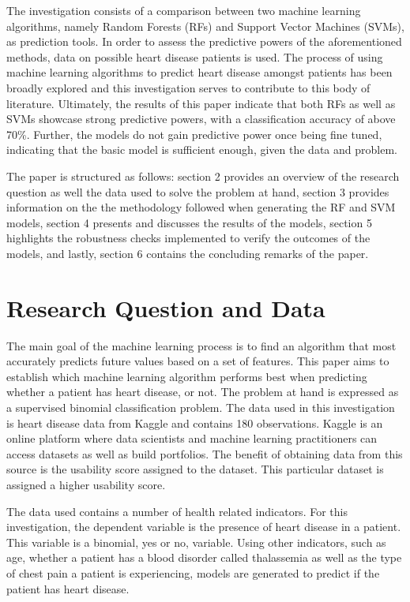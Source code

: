 \documentclass[11pt,preprint, authoryear]{elsarticle}
\numberwithin{equation}{section}
\numberwithin{figure}{section}
\numberwithin{table}{section}
\begin{document}
The investigation consists of a comparison between two machine learning
algorithms, namely Random Forests (RFs) and Support Vector Machines
(SVMs), as prediction tools. In order to assess the predictive powers of
the aforementioned methods, data on possible heart disease patients is
used. The process of using machine learning algorithms to predict heart
disease amongst patients has been broadly explored and this
investigation serves to contribute to this body of literature.
Ultimately, the results of this paper indicate that both RFs as well as
SVMs showcase strong predictive powers, with a classification accuracy
of above 70\%. Further, the models do not gain predictive power once
being fine tuned, indicating that the basic model is sufficient enough,
given the data and problem.

The paper is structured as follows: section 2 provides an overview of
the research question as well the data used to solve the problem at
hand, section 3 provides information on the the methodology followed
when generating the RF and SVM models, section 4 presents and discusses
the results of the models, section 5 highlights the robustness checks
implemented to verify the outcomes of the models, and lastly, section 6
contains the concluding remarks of the paper.

\hypertarget{research-question-and-data}{%
\section{Research Question and Data}\label{research-question-and-data}}

The main goal of the machine learning process is to find an algorithm
that most accurately predicts future values based on a set of features.
This paper aims to establish which machine learning algorithm performs
best when predicting whether a patient has heart disease, or not. The
problem at hand is expressed as a supervised binomial classification
problem. The data used in this investigation is heart disease data from
Kaggle and contains 180 observations. Kaggle is an online platform where
data scientists and machine learning practitioners can access datasets
as well as build portfolios. The benefit of obtaining data from this
source is the usability score assigned to the dataset. This particular
dataset is assigned a higher usability score.

The data used contains a number of health related indicators. For this
investigation, the dependent variable is the presence of heart disease
in a patient. This variable is a binomial, yes or no, variable. Using
other indicators, such as age, whether a patient has a blood disorder
called thalassemia as well as the type of chest pain a patient is
experiencing, models are generated to predict if the patient has heart
disease.
\end{document}
